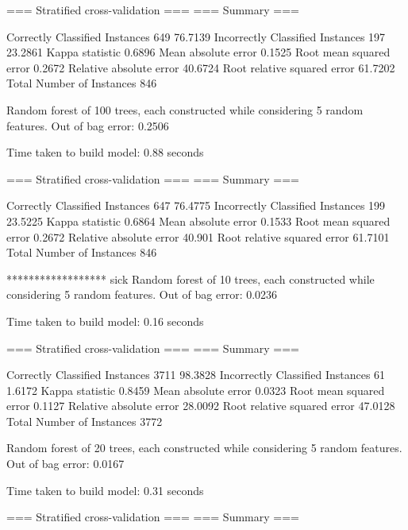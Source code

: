 === Stratified cross-validation ===
=== Summary ===

Correctly Classified Instances         649               76.7139 %
Incorrectly Classified Instances       197               23.2861 %
Kappa statistic                          0.6896
Mean absolute error                      0.1525
Root mean squared error                  0.2672
Relative absolute error                 40.6724 %
Root relative squared error             61.7202 %
Total Number of Instances              846



Random forest of 100 trees, each constructed while considering 5 random features.
Out of bag error: 0.2506



Time taken to build model: 0.88 seconds

=== Stratified cross-validation ===
=== Summary ===

Correctly Classified Instances         647               76.4775 %
Incorrectly Classified Instances       199               23.5225 %
Kappa statistic                          0.6864
Mean absolute error                      0.1533
Root mean squared error                  0.2672
Relative absolute error                 40.901  %
Root relative squared error             61.7101 %
Total Number of Instances              846     


****************** sick
Random forest of 10 trees, each constructed while considering 5 random features.
Out of bag error: 0.0236



Time taken to build model: 0.16 seconds

=== Stratified cross-validation ===
=== Summary ===

Correctly Classified Instances        3711               98.3828 %
Incorrectly Classified Instances        61                1.6172 %
Kappa statistic                          0.8459
Mean absolute error                      0.0323
Root mean squared error                  0.1127
Relative absolute error                 28.0092 %
Root relative squared error             47.0128 %
Total Number of Instances             3772     




Random forest of 20 trees, each constructed while considering 5 random features.
Out of bag error: 0.0167



Time taken to build model: 0.31 seconds

=== Stratified cross-validation ===
=== Summary ===

